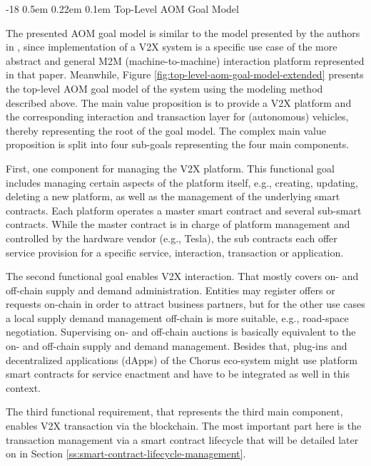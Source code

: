 \documentclass{llncs}
\makeatletter
\renewcommand\subsubsection{\@startsection{subsubsection}{3}{\z@}%
		{-18\p@ \@plus -4\p@ \@minus -4\p@}%
		{0.5em \@plus 0.22em \@minus 0.1em}%
		{\normalfont\normalsize\bfseries\boldmath}}
\makeatother
\begin{document}
{			
					
			\subsubsection{Top-Level AOM Goal Model}
				\label{sss:top-level-goal-model}
				
				The presented AOM goal model is similar to the model presented by the authors in \cite{leidingM2M}, since implementation of a V2X system is a specific use case of the more abstract and general M2M (machine-to-machine) interaction platform represented in that paper. Meanwhile, Figure \ref{fig:top-level-aom-goal-model-extended} presents the top-level AOM goal model of the system using the modeling method described above. The main value proposition is to provide a V2X platform and the corresponding interaction and transaction layer for (autonomous) vehicles, thereby representing the root of the goal model. The complex main value proposition is split into four sub-goals representing the four main components.
				
				First, one component for managing the V2X platform. This functional goal includes managing certain aspects of the platform itself, e.g., creating, updating, deleting a new platform, as well as the management of the underlying smart contracts. Each platform operates a master smart contract and several sub-smart contracts. While the master contract is in charge of platform management and controlled by the hardware vendor (e.g., Tesla), the sub contracts each offer service provision for a specific service, interaction, transaction or application.
				
				The second functional goal enables V2X interaction. That mostly covers on- and off-chain supply and demand administration. Entities may register offers or requests on-chain in order to attract business partners, but for the other use cases a local supply demand management off-chain is more suitable, e.g., road-space negotiation. Supervising on- and off-chain auctions is basically equivalent to the on- and off-chain supply and demand management. Besides that, plug-ins and decentralized applications (dApps) of the Chorus eco-system might use platform smart contracts for service enactment and have to be integrated as well in this context.
				
				The third functional requirement, that represents the third main component, enables V2X transaction via the blockchain. The most important part here is the transaction management via a smart contract lifecycle that will be detailed later on in Section \ref{ss:smart-contract-lifecycle-management}.
				
}
\end{document}
